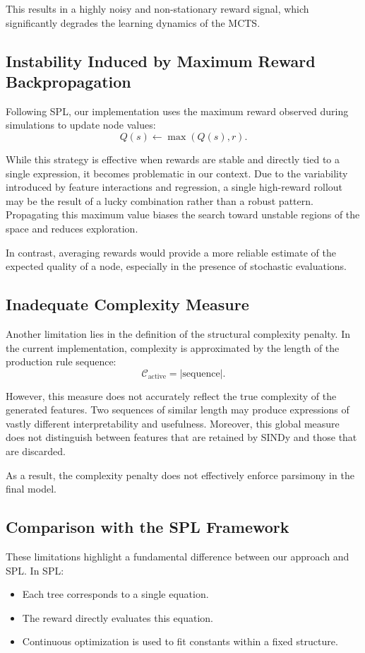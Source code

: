 \documentclass[11pt,a4paper]{article}
\begin{document}
This results in a highly noisy and non-stationary reward signal, which significantly degrades the learning dynamics of the MCTS.

\subsection{Instability Induced by Maximum Reward Backpropagation}

Following SPL, our implementation uses the maximum reward observed during simulations to update node values:
\[
Q(s) \leftarrow \max(Q(s), r).
\]

While this strategy is effective when rewards are stable and directly tied to a single expression, it becomes problematic in our context. Due to the variability introduced by feature interactions and regression, a single high-reward rollout may be the result of a lucky combination rather than a robust pattern. Propagating this maximum value biases the search toward unstable regions of the space and reduces exploration.

In contrast, averaging rewards would provide a more reliable estimate of the expected quality of a node, especially in the presence of stochastic evaluations.

\subsection{Inadequate Complexity Measure}

Another limitation lies in the definition of the structural complexity penalty. In the current implementation, complexity is approximated by the length of the production rule sequence:
\[
\mathcal{C}_{\text{active}} = |\text{sequence}|.
\]

However, this measure does not accurately reflect the true complexity of the generated features. Two sequences of similar length may produce expressions of vastly different interpretability and usefulness. Moreover, this global measure does not distinguish between features that are retained by SINDy and those that are discarded.

As a result, the complexity penalty does not effectively enforce parsimony in the final model.

\subsection{Comparison with the SPL Framework}

These limitations highlight a fundamental difference between our approach and SPL. In SPL:
\begin{itemize}
    \item Each tree corresponds to a single equation.
    \item The reward directly evaluates this equation.
    \item Continuous optimization is used to fit constants within a fixed structure.
\end{itemize}
\end{document}
